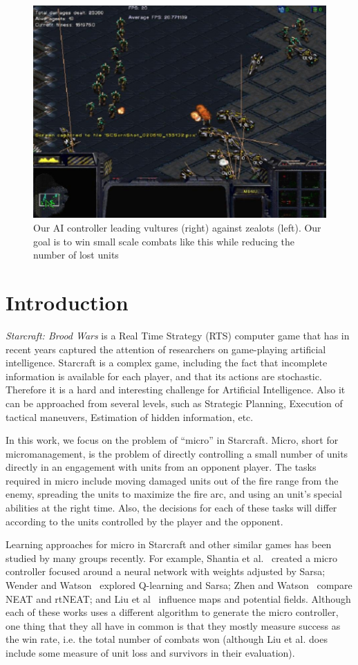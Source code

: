\begin{figure}
  \includegraphics[width=.45\textwidth]{figures/vultures_vs_zealots_combat}
  \caption{Our AI controller leading vultures (right) against zealots
    (left). Our goal is to win small scale combats like this while
    reducing the number of lost units}
    \label{fig:combat-example}
\end{figure}

\section{Introduction}\label{section:introduction}

\emph{Starcraft: Brood Wars} is a Real Time Strategy (RTS) computer
game that has in recent years captured the attention of researchers on
game-playing artificial intelligence. Starcraft is a complex game,
including the fact that incomplete information is available for each
player, and that its actions are stochastic. Therefore it is a hard
and interesting challenge for Artificial Intelligence. Also it can be
approached from several levels, such as Strategic Planning, Execution
of tactical maneuvers, Estimation of hidden information, etc.

In this work, we focus on the problem of ``micro'' in
Starcraft. Micro, short for micromanagement, is the problem of
directly controlling a small number of units directly in an engagement
with units from an opponent player. The tasks required in micro
include moving damaged units out of the fire range from the enemy,
spreading the units to maximize the fire arc, and using an unit's
special abilities at the right time. Also, the decisions for each of
these tasks will differ according to the units controlled by the
player and the opponent.

Learning approaches for micro in Starcraft and other similar games has
been studied by many groups recently. For example, Shantia et
al.~\cite{Shantia11ConnectionistSC} created a micro controller focused
around a neural network with weights adjusted by Sarsa; Wender and
Watson~\cite{Wender12ReinforcementMicroSC} explored Q-learning and
Sarsa; Zhen and Watson~\cite{Zhen13NeuroEvoSC} compare NEAT and
rtNEAT; and Liu et al~\cite{Liu14EffectiveMicro} influence maps and
potential fields.  Although each of these works uses a different
algorithm to generate the micro controller, one thing that they all
have in common is that they mostly measure success as the win rate,
i.e. the total number of combats won (although Liu et al. does include
some measure of unit loss and survivors in their evaluation).

